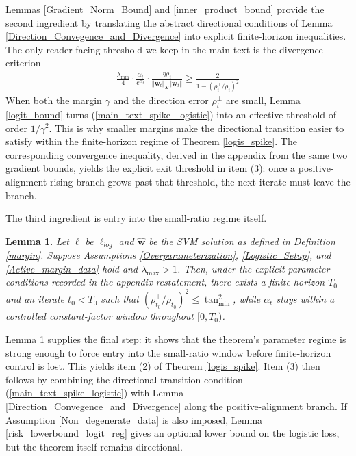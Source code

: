 \documentclass[pdflatex,sn-basic]{sn-jnl}%
\theoremstyle{thmstyleone}%
\newtheorem{lemma}[theorem]{Lemma}
\begin{document}
Lemmas \ref{Gradient_Norm_Bound} and \ref{inner_product_bound} provide the second ingredient by translating the abstract directional conditions of Lemma \ref{Direction_Convegence_and_Divergence} into explicit finite-horizon inequalities. The only reader-facing threshold we keep in the main text is the divergence criterion
\begin{equation}\label{main_text_spike_logistic}
\begin{aligned}
  \frac{\lambda_{\min}}{4}
  \cdot
  \frac{\alpha_t}{e^{\alpha_t}}
  \cdot 
  \frac{\eta {\rho}_t}{
    \Vert \mathbf{w}_t \Vert_{\mathbf{\Sigma}}
    \Vert \mathbf{w}_t \Vert
  }
  \ge
  \frac{2}{
    1 - \left({\rho}_t^{\perp} / \rho_t\right)^2
  }
\end{aligned}
\end{equation}
When both the margin $\gamma$ and the direction error $\rho_t^{\perp}$ are small, Lemma \ref{logit_bound} turns (\ref{main_text_spike_logistic}) into an effective threshold of order $1/\gamma^2$. This is why smaller margins make the directional transition easier to satisfy within the finite-horizon regime of Theorem \ref{logis_spike}. The corresponding convergence inequality, derived in the appendix from the same two gradient bounds, yields the explicit exit threshold in item (3): once a positive-alignment rising branch grows past that threshold, the next iterate must leave the branch.

The third ingredient is entry into the small-ratio regime itself.
\begin{lemma}\label{First_Phase}
  Let $\ell$ be $\ell_{log}$ and $\hat{\mathbf{w}}$ be the SVM solution as defined in Definition \ref{margin}. Suppose Assumptions \ref{Overparameterization}, \ref{Logistic_Setup}, and \ref{Active_margin_data} hold and $\lambda_{\max} > 1$. Then, under the explicit parameter conditions recorded in the appendix restatement, there exists a finite horizon $T_0$ and an iterate $t_0<T_0$ such that $\left(\rho_{t_0}^{\perp} / \rho_{t_0}\right)^2 \le \tan_{\min}^2$, while $\alpha_t$ stays within a controlled constant-factor window throughout $[0,T_0)$.
\end{lemma}
Lemma \ref{First_Phase} supplies the final step: it shows that the theorem's parameter regime is strong enough to force entry into the small-ratio window before finite-horizon control is lost. This yields item (2) of Theorem \ref{logis_spike}. Item (3) then follows by combining the directional transition condition (\ref{main_text_spike_logistic}) with Lemma \ref{Direction_Convegence_and_Divergence} along the positive-alignment branch. If Assumption \ref{Non_degenerate_data} is also imposed, Lemma \ref{risk_lowerbound_logit_reg} gives an optional lower bound on the logistic loss, but the theorem itself remains directional.
\end{document}
